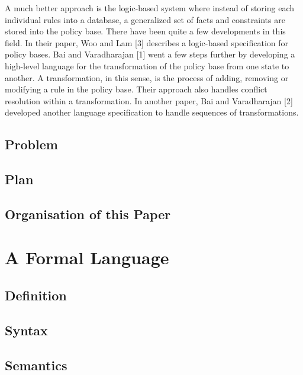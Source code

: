 \documentclass[draft]{article}
\begin{document}
      A much better approach is the logic-based system where instead of
      storing each individual rules into a database, a generalized set of
      facts and constraints are stored into the policy base. There have been
      quite a few developments in this field. In their paper, Woo and Lam [3]
      describes a logic-based specification for policy bases. Bai and
      Varadharajan [1] went a few steps further by developing a high-level
      language for the transformation of the policy base from one state to
      another. A transformation, in this sense, is the process of adding,
      removing or modifying a rule in the policy base. Their approach also
      handles conflict resolution within a transformation. In another paper,
      Bai and Varadharajan [2] developed another language specification to
      handle sequences of transformations.

    \subsection{Problem}

    \subsection{Plan}

    \subsection{Organisation of this Paper}

    \pagebreak

  \section{A Formal Language}

    \subsection{Definition}

    \subsection{Syntax}

    \subsection{Semantics}

    \pagebreak
\end{document}
